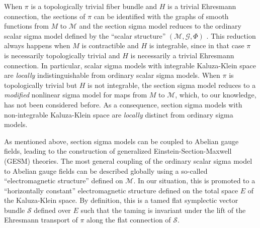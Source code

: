 \documentclass[10pt, cmp, numbook, final, a4paper]{svjour}
\newcommand{\cM}{\mathcal{M}}
\def\cG{\mathcal{G}}
\def\bcS{\boldsymbol{\mathcal{S}}}
\begin{document}
When $\pi$ is a topologically trivial fiber bundle and $H$ is a
trivial Ehresmann connection, the sections of $\pi$ can be identified
with the graphs of smooth functions from $M$ to $\cM$ and the section
sigma model reduces to the ordinary scalar sigma model defined by the
``scalar structure'' $(\cM,\cG,\Phi)$ \cite{GESM,GESMNote}. This
reduction always happens when $M$ is contractible and $H$ is
integrable, since in that case $\pi$ is necessarily topologically
trivial and $H$ is necessarily a trivial Ehresmann connection. In
particular, scalar sigma models with integrable Kaluza-Klein space are
{\em locally} indistinguishable from ordinary scalar sigma
models. When $\pi$ is topologically trivial but $H$ is not integrable,
the section sigma model reduces to a {\em modified} nonlinear sigma
model for maps from $M$ to $\cM$, which, to our knowledge, has not
been considered before. As a consequence, section sigma models with
non-integrable Kaluza-Klein space are {\em locally} distinct from
ordinary sigma models.

As mentioned above, section sigma models can be coupled
to Abelian gauge fields, leading to the construction of generalized
Einstein-Section-Maxwell (GESM) theories. The most general coupling of the
ordinary scalar sigma model to Abelian gauge fields can be described
globally \cite{GESM} using a so-called ``electromagnetic structure''
defined on $\cM$. In our situation, this is promoted to a 
``horizontally constant'' electromagnetic structure defined on the
total space $E$ of the Kaluza-Klein space. By definition, this is a
tamed flat symplectic vector bundle $\bcS$ defined over $E$ such that
the taming is invariant under the lift of
the Ehresmann transport of $\pi$ along the flat connection of
$\bcS$.
\end{document}
